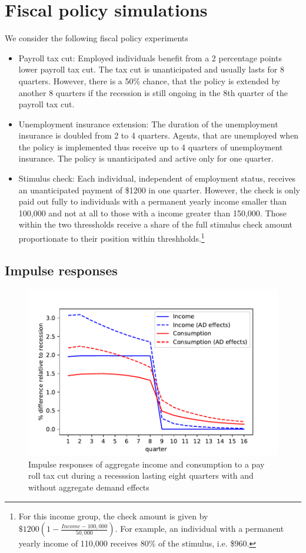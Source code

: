 \documentclass[11pt]{article}
\begin{document}
	
	\section{Fiscal policy simulations}
	
	We consider the following fiscal policy experiments
	
	\begin{itemize}
		\item Payroll tax cut: Employed individuals benefit from a 2 percentage points lower payroll tax cut. The tax cut is unanticipated and usually lasts for 8 quarters. However, there is a 50\% chance, that the policy is extended by another 8 quarters if the recession is still ongoing in the 8th quarter of the payroll tax cut. 
		\item Unemployment insurance extension: The duration of the unemployment insurance is doubled from 2 to 4 quarters. Agents, that are unemployed when the policy is implemented thus receive up to 4 quarters of unemployment insurance. The policy is unanticipated and active only for one quarter.
		\item Stimulus check: Each individual, independent of employment status, receives an unanticipated payment of \$1200 in one quarter. However, the check is only paid out fully to individuals with a permanent yearly income smaller than 100,000 and not at all to those with a income greater than 150,000. Those within the two thressholds receive a share of the full stimulus check amount proportionate to their position within threshholds.\footnote{For this income group, the check amount is given by $\$1200 (1-\frac{Income-100,000}{50,000})$. For example, an individual with a permanent yearly income of 110,000 receives 80\% of the stimulus, i.e. \$960.}
	\end{itemize}
	
	\subsection{Impulse responses}
	
	
	\begin{figure}
		\centering
		\includegraphics[width=0.8\linewidth]{../Code/HA-Models/FromPandemicCode/Figures/recession_taxcut_relrecession}
		\caption{Impulse responses of aggregate income and consumption to a pay roll tax cut during a recesssion lasting eight quarters with and without aggregate demand effects}
		\label{fig:recessiontaxcutrelrecession}
	\end{figure}
	
\end{document}
